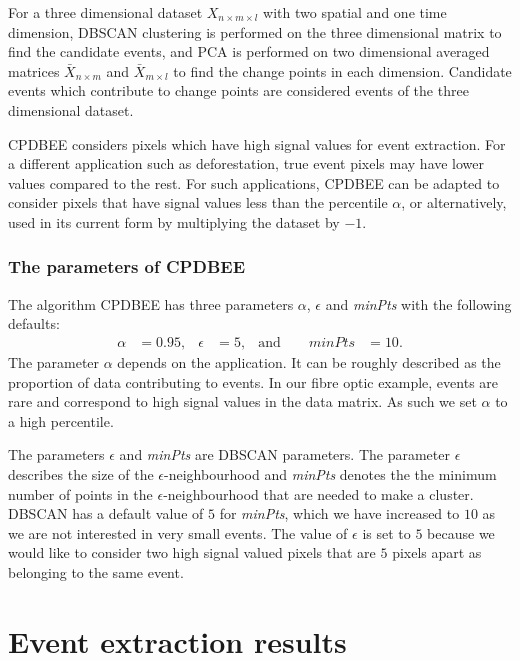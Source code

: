\documentclass[a4paper,11pt]{article}
\begin{document}
For a three dimensional dataset $X_{n\times m \times l}$ with two spatial and one time dimension, DBSCAN clustering is performed on the three dimensional matrix to find the candidate events, and PCA is performed on two dimensional averaged matrices $\bar{X}_{n \times m}$ and $\bar{X}_{m \times l}$ to find the change points in each dimension. Candidate events which contribute to change points are considered events of the three dimensional dataset.

CPDBEE considers pixels which have high signal values for event extraction. For a different application such as deforestation, true event pixels may have lower values compared to the rest. For such applications, CPDBEE can be adapted to consider pixels that have signal values less than the percentile $\alpha$, or alternatively, used in its current form by multiplying the dataset by $-1$.

\subsubsection{The parameters of CPDBEE}
The algorithm CPDBEE has three parameters $\alpha$, $\epsilon$ and \textit{minPts} with the following defaults:
\begin{align}\label{eq:paradefaults}
	\alpha                           & = 0.95  , &
	\epsilon                         & = 5  ,    &
	\text{and} \qquad \textit{minPts} & = 10  .
\end{align}
The parameter $\alpha$ depends on the application. It can be roughly described as the proportion of data contributing to events. In our fibre optic example, events are rare and correspond to high signal values in the data matrix. As such we set $\alpha$ to a high percentile.

The parameters $\epsilon$ and \textit{minPts} are DBSCAN parameters. The parameter $\epsilon$ describes the size of the $\epsilon$-neighbourhood and \textit{minPts} denotes the the minimum number of points in the $\epsilon$-neighbourhood that are needed to make a cluster. DBSCAN has a default value of $5$ for \textit{minPts}, which we have increased to $10$ as we are not interested in very small events. The value of $\epsilon$ is set to $5$ because we would like to consider two high signal valued pixels that are $5$ pixels apart as belonging to the same event.

\section{Event extraction results}\label{sec:ResultsExtraction}
\end{document}
